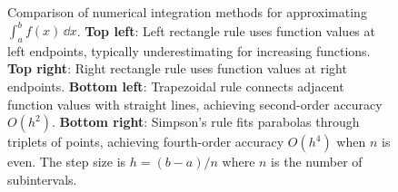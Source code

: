 \begin{figure}[htbp]
\caption{Comparison of numerical integration methods for approximating $\int_a^b f(x)\,\dd x$. \textbf{Top left}: Left rectangle rule uses function values at left endpoints, typically underestimating for increasing functions. \textbf{Top right}: Right rectangle rule uses function values at right endpoints. \textbf{Bottom left}: Trapezoidal rule connects adjacent function values with straight lines, achieving second-order accuracy $O(h^2)$. \textbf{Bottom right}: Simpson's rule fits parabolas through triplets of points, achieving fourth-order accuracy $O(h^4)$ when $n$ is even. The step size is $h = (b-a)/n$ where $n$ is the number of subintervals.}
\label{fig:numerical_integration}
\end{figure}
